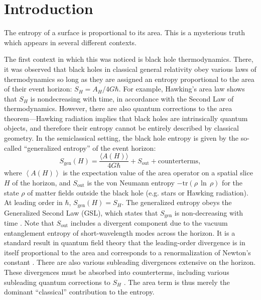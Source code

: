 \documentclass[12pt]{article}
\theoremstyle{remark}
\numberwithin{equation}{section}
\numberwithin{equation}{section}
\begin{document}
\newpage


\tableofcontents

\newpage

\section{Introduction}\label{intro}
The entropy of a surface is proportional to its area.  This is a mysterious truth which appears in several different contexts.

The first context in which this was noticed is black hole thermodynamics.  There, it was observed that black holes in classical general relativity obey various laws of thermodynamics so long as they are assigned an entropy proportional to the area of their event horizon: $S_H = A_H/4G\hbar$.  For example, Hawking's area law \cite{Hawking71} shows that $S_{H}$ is nondecreasing with time, in accordance with the Second Law of thermodynamics.   However, there are also quantum corrections to the area theorem---Hawking radiation implies that black holes are intrinsically quantum objects, and therefore their entropy cannot be entirely described by classical geometry.  In the semiclassical setting, the black hole entropy is given by the so-called ``generalized entropy'' of the event horizon:
\begin{equation}
S_\mathrm{gen}(H) = \frac{\langle A (H) \rangle}{4G\hbar} + S_\mathrm{out} + \mathrm{counterterms}, \label{Sgen}
\end{equation}
where $\left \langle A(H)\right\rangle$ is the expectation value of the area operator on a spatial slice $H$ of the horizon, and $S_\mathrm{out}$ is the von Neumann entropy $-\mathrm{tr}(\rho\,\ln\,\rho)$ for the state $\rho$ of matter fields outside the black hole (e.g. stars or Hawking radiation).  At leading order in $\hbar$, $S_{\text{gen}}(H)=S_{H}$. The generalized entropy obeys the Generalized Second Law (GSL), which states that $S_{\text{gen}}$ is non-decreasing with time \cite{Bekenstein73, Hawking75}. Note that $S_\mathrm{out}$ includes a divergent component due to the vacuum entanglement entropy of short-wavelength modes across the horizon. It is a standard result in quantum field theory that the leading-order divergence is in itself proportional to the area \cite{Srednicki93} and corresponds to a renormalization of Newton's constant \cite{SusskindUglum}. There are also various subleading divergences extensive on the horizon.  These divergences must be absorbed into counterterms, including various subleading quantum corrections to $S_H$ \cite{33}.  The area term is thus merely the dominant ``classical'' contribution to the entropy.
\end{document}
